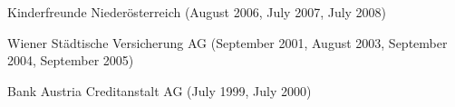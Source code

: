 \nopagebreak
{}
	{\begin{cvenumerate}
		\item Kinderfreunde	Niederösterreich (August 2006, July 2007, July 2008)
		\item Wiener Städtische Versicherung AG (September 2001, August 2003,
		September 2004, September 2005)
		\item Bank Austria Creditanstalt AG (July 1999, July 2000)
	\end{cvenumerate}}